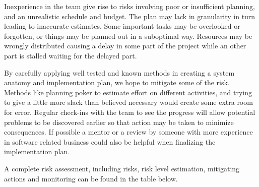 \documentclass[titlepage]{article}
\begin{document}
Inexperience in the team give rise to risks involving poor or insufficient planning, and an unrealistic schedule and budget. The plan may lack in granularity in turn leading to inaccurate estimates. Some important tasks may be overlooked or forgotten, or things may be planned out in a suboptimal way. Resources may be wrongly distributed causing a delay in some part of the project while an other part is stalled waiting for the delayed part.

By carefully applying well tested and known methods in creating a system anatomy and implementation plan, we hope to mitigate some of the risk. Methods like planning poker to estimate effort on different activities, and trying to give a little more slack than believed necessary would create some extra room for error. Regular check-ins with the team to see the progress will allow potential problems to be discovered earlier so that action may be taken to minimize consequences. If possible a mentor or a review by someone with more experience in software related business could also be helpful when finalizing the implementation plan.

A complete risk assessment, including risks, risk level estimation, mitigating actions and monitoring can be found in the table below.
\end{document}

